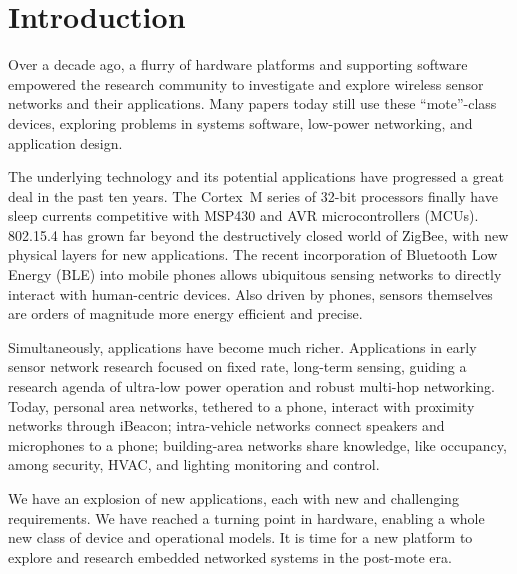 \section{Introduction}
\label{sec:intro}

Over a decade ago, a flurry of hardware platforms and supporting software
empowered the research community to investigate and explore wireless sensor
networks and their applications. Many papers today still use these
``mote''-class devices, exploring problems in systems software, low-power
networking, and application design.

The underlying technology and its potential applications have progressed a
great deal in the past ten years. The Cortex~M series of 32-bit processors
finally have sleep currents competitive with MSP430 and AVR microcontrollers (MCUs).
802.15.4 has grown far beyond the destructively closed world of ZigBee, with
new physical layers for new applications. The recent incorporation of
Bluetooth Low Energy (BLE) into mobile phones allows ubiquitous sensing networks to
directly interact with human-centric devices. Also driven by phones, sensors
themselves are orders of magnitude more energy efficient and precise.

Simultaneously, applications have become much richer. Applications in early
sensor network research focused on fixed rate, long-term sensing, guiding a
research agenda of ultra-low power operation and robust multi-hop networking.
Today, personal area networks, tethered to a phone, interact with
proximity networks through iBeacon; intra-vehicle networks connect speakers
and microphones to a phone; building-area networks share knowledge, like
occupancy, among security, HVAC, and lighting monitoring and control.

We have an explosion of new applications, each with new and challenging
requirements. We have reached a turning point in hardware, enabling a whole
new class of device and operational models. It is time for a new platform to
explore and research embedded networked systems in the post-mote era.

